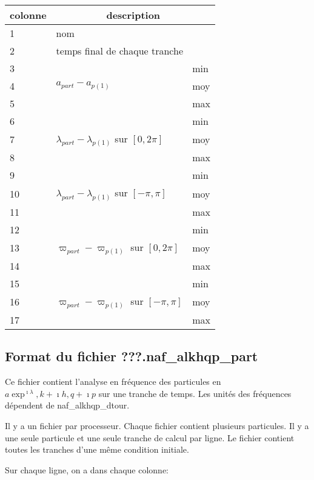 \documentclass[11pt]{article}
\begin{document}
\begin{tabularx}{\textwidth}{|l|l|X|}
 \hline
 colonne &      \multicolumn{2}{c|}{description} \\ \hline
1  &    \multicolumn{2}{l|}{nom} \\ \hline
2  &    \multicolumn{2}{l|}{temps final de chaque tranche} \\ \hline
3 &    & min\\
4 &  $a_{part}-a_{p(1)}$ & moy\\
5 & &   max\\ \hline
6 & &   min\\
7 & $\lambda_{part}-\lambda_{p(1)}$ sur $[0,2\pi]$&moy\\
8 &    & max\\ \hline
9 &    & min\\
10& $\lambda_{part}-\lambda_{p(1)}$ sur $[-\pi,\pi]$ & moy\\
11 & &    max\\ \hline
12 & &    min\\
13 &   $\varpi_{part}-\varpi_{p(1)}$ sur $[0,2\pi]$ & moy\\
14 & &    max\\ \hline
15 & &    min\\
16 & $\varpi_{part}-\varpi_{p(1)}$ sur $[-\pi,\pi]$ & moy\\
17 & &    max\\ \hline
\end{tabularx}

\subsection{Format du fichier {\bf ???.naf\_alkhqp\_part} }

Ce fichier contient l'analyse en fr\'equence des particules en $a\exp^{\imath\lambda}, k+\imath h, q+\imath p$ sur une tranche de temps. Les unit\'es des fr\'equences d\'ependent de naf\_alkhqp\_dtour.

 Il y a un fichier par processeur. Chaque fichier contient plusieurs particules. Il y a une seule particule et une seule tranche de calcul  par ligne. Le fichier contient toutes les tranches d'une m\^eme  condition initiale.


Sur chaque ligne, on a dans chaque colonne: 
\end{document}
